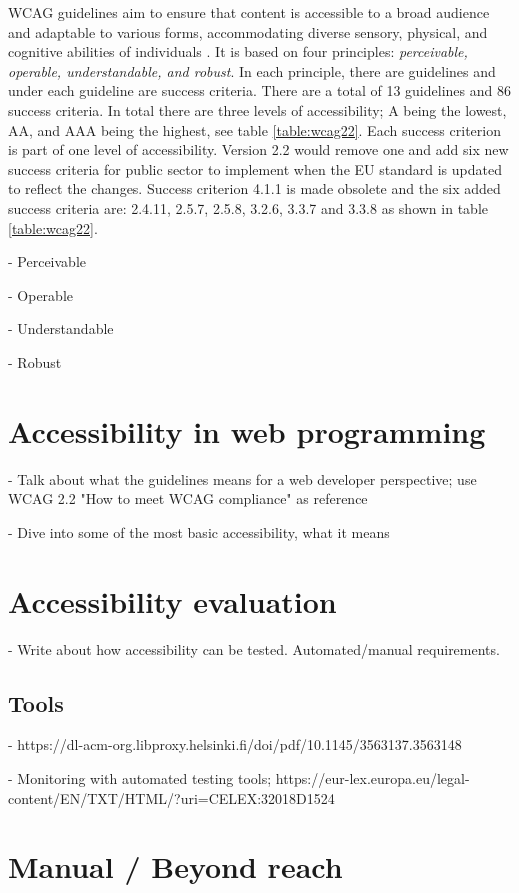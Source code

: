 WCAG guidelines aim to ensure that content is accessible to a broad audience and adaptable to various forms, accommodating diverse sensory, physical, and cognitive abilities of individuals \citep{wcag22}. It is based on four principles: \textit{perceivable, operable, understandable, and robust}. In each principle, there are guidelines and under each guideline are success criteria. There are a total of 13 guidelines and 86 success criteria. In total there are three levels of accessibility; A being the lowest, AA, and AAA being the highest, see table \ref{table:wcag22}. Each success criterion is part of one level of accessibility. Version 2.2 would remove one and add six new success criteria for public sector to implement when the EU standard is updated to reflect the changes. Success criterion 4.1.1 is made obsolete and the six added success criteria are: 2.4.11, 2.5.7, 2.5.8, 3.2.6, 3.3.7 and 3.3.8 as shown in table \ref{table:wcag22}.



- Perceivable

- Operable

- Understandable

- Robust


\section{Accessibility in web programming}

- Talk about what the guidelines means for a web developer perspective; use WCAG 2.2 "How to meet WCAG compliance" as reference

- Dive into some of the most basic accessibility, what it means

\section{Accessibility evaluation}

- Write about how accessibility can be tested. Automated/manual requirements.

\subsection{Tools}

- https://dl-acm-org.libproxy.helsinki.fi/doi/pdf/10.1145/3563137.3563148

- Monitoring with automated testing tools; https://eur-lex.europa.eu/legal-content/EN/TXT/HTML/?uri=CELEX:32018D1524

\section{Manual / Beyond reach}